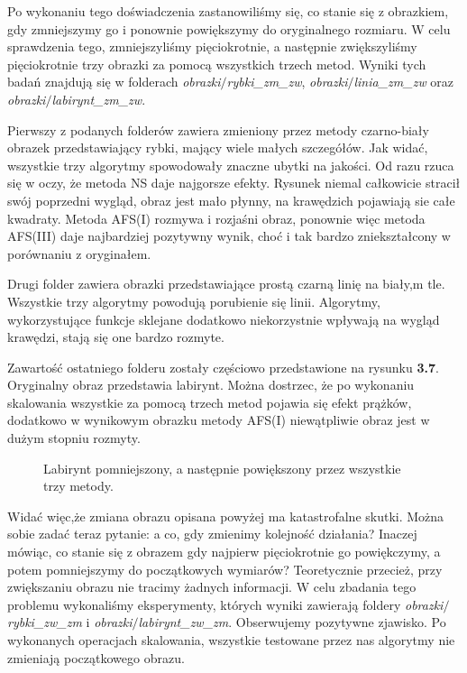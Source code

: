 Po wykonaniu tego doświadczenia zastanowiliśmy się, co stanie się z obrazkiem, gdy zmniejszymy go i ponownie powiększymy do oryginalnego rozmiaru.
W celu sprawdzenia tego, zmniejszyliśmy pięciokrotnie, a następnie zwiększyliśmy pięciokrotnie trzy obrazki za pomocą wszystkich trzech metod.
Wyniki tych badań znajdują się w folderach \textit{obrazki$\slash$rybki\_zm\_zw},
\textit{obrazki$\slash$linia\_zm\_zw} oraz \textit{obrazki$\slash$labirynt\_zm\_zw}.

Pierwszy z podanych folderów zawiera zmieniony przez metody czarno-biały obrazek
przedstawiający rybki, mający wiele małych szczegółów. Jak widać, wszystkie
trzy algorytmy spowodowały znaczne ubytki na jakości. Od razu rzuca się w oczy,
że metoda NS daje najgorsze efekty. Rysunek niemal całkowicie stracił swój poprzedni wygląd, obraz jest mało płynny, na krawędzich pojawiają sie całe kwadraty. Metoda AFS(I) rozmywa i rozjaśni obraz, ponownie więc metoda AFS(III) daje najbardziej pozytywny wynik, choć i tak bardzo zniekształcony w porównaniu z oryginałem.

Drugi folder zawiera obrazki przedstawiające prostą czarną linię na biały,m tle.
Wszystkie trzy algorytmy powodują porubienie się linii. Algorytmy, wykorzystujące
funkcje sklejane dodatkowo niekorzystnie wpływają na wygląd krawędzi, stają się
one bardzo rozmyte.

Zawartość ostatniego folderu zostały częściowo przedstawione na rysunku \textbf{3.7}.
Oryginalny obraz przedstawia labirynt. Można dostrzec, że po wykonaniu skalowania
wszystkie za pomocą trzech metod pojawia się efekt prążków, dodatkowo w wynikowym
obrazku metody AFS(I) niewątpliwie obraz jest w dużym stopniu rozmyty.
\begin{figure}[h!tb]
\begin{center}
\caption{Labirynt pomniejszony, a następnie powiększony przez wszystkie trzy metody.}
\end{center}
\end{figure}

Widać więc,że zmiana obrazu opisana powyżej ma katastrofalne skutki. Można sobie
zadać teraz pytanie: a co, gdy zmienimy kolejność działania? Inaczej mówiąc,
co stanie się z obrazem gdy najpierw pięciokrotnie go powiękczymy, a potem pomniejszymy do początkowych wymiarów?
Teoretycznie przecież, przy zwiększaniu obrazu nie tracimy żadnych informacji.
W celu zbadania tego problemu wykonaliśmy eksperymenty, których wyniki zawierają foldery
\textit{obrazki$\slash$rybki\_zw\_zm} i \textit{obrazki$\slash$labirynt\_zw\_zm}.
Obserwujemy pozytywne zjawisko. Po wykonanych operacjach skalowania,
wszystkie testowane przez nas algorytmy nie zmieniają początkowego obrazu.

